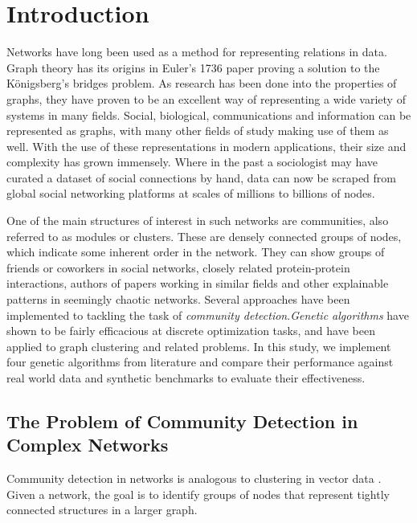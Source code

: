 \chapter{Introduction}
\label{ch:intro:introduction}
Networks have long been used as a method for representing relations in data. Graph theory has its origins in Euler's 1736 paper proving a solution to the K\"{o}nigsberg's bridges problem. As research has been done into the properties of graphs, they have proven to be an excellent way of representing a wide variety of systems in many fields. Social, biological, communications and information can be represented as graphs, with many other fields of study making use of them as well. With the use of these representations in modern applications, their size and complexity has grown immensely. Where in the past a sociologist may have curated a dataset of social connections by hand, data can now be scraped from global social networking platforms at scales of millions to billions of nodes. 

One of the main structures of interest in such networks are communities, also referred to as modules or clusters. These are densely connected groups of nodes, which indicate some inherent order in the network. They can show groups of friends or coworkers in social networks, closely related protein-protein interactions, authors of papers working in similar fields and other explainable patterns in seemingly chaotic networks. Several approaches have been implemented to tackling the task of \textit{community detection}.\textit{Genetic algorithms} have shown to be fairly efficacious at discrete optimization tasks, and have been applied to graph clustering and related problems. In this study, we implement four genetic algorithms from literature and compare their performance against real world data and synthetic benchmarks to evaluate their effectiveness.


\pagebreak

\section{The Problem of Community Detection in \\Complex Networks}
Community detection in networks is analogous to clustering in vector data \cite{Peel2016}. Given a network, the goal is to identify groups of nodes that represent tightly connected structures in a larger graph. 

